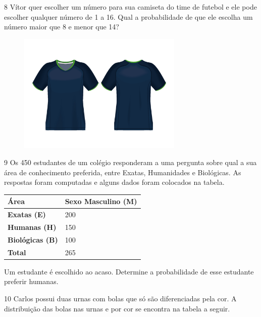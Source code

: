 \num{8} Vítor quer escolher um número para sua camiseta do time de futebol e ele
pode escolher qualquer número de 1 a 16. Qual a probabilidade de que ele
escolha um número maior que 8 e menor que 14?

\begin{figure}[htpb!]
\centering
\includegraphics[width=0.7\textwidth]{./media/image75d.png}
\end{figure}


\num{9} Os 450 estudantes de um colégio responderam a uma pergunta sobre qual a
sua área de conhecimento preferida, entre Exatas, Humanidades e
Biológicas. As respostas foram computadas e alguns dados foram colocados
na tabela.

\vspace{2ex}

\begin{longtable}[]{@{}ll@{}}
\toprule
\hline
\textbf{Área} & \textbf{Sexo Masculino (M)}\tabularnewline
\hline
\textbf{Exatas (E)} & 200\tabularnewline
\hline
\textbf{Humanas (H)} & 150\tabularnewline
\hline
\textbf{Biológicas (B)} & 100\tabularnewline
\hline
\textbf{Total} & 265\tabularnewline
\hline
\bottomrule
\end{longtable}

\pagebreak
Um estudante é escolhido ao acaso. Determine a probabilidade de esse
estudante preferir humanas.


\num{10} Carlos possui duas urnas com bolas que só são diferenciadas pela cor. A
distribuição das bolas nas urnas e por cor se encontra na tabela a
seguir.

